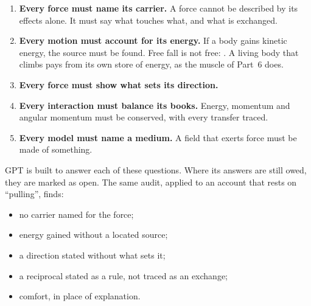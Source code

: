 \documentclass[11pt,a4paper]{article}
\begin{document}
\begin{enumerate}
    \item \textbf{Every force must name its carrier.} A force cannot be described by its effects alone. It must say what touches what, and what is exchanged. 

    \item \textbf{Every motion must account for its energy.} If a body gains kinetic energy, the source must be found. Free fall is not free: . A living body that climbs pays from its own store of energy, as the muscle of Part~6 does.

    \item \textbf{Every force must show what sets its direction.} 

    \item \textbf{Every interaction must balance its books.} Energy, momentum and angular momentum must be conserved, with every transfer traced. 

    \item \textbf{Every model must name a medium.} A field that exerts force must be made of something. 
\end{enumerate}

GPT is built to answer each of these questions. Where its answers are still owed, they are marked as open. The same audit, applied to an account that rests on ``pulling'', finds:
\begin{itemize}
    \item no carrier named for the force;
    \item energy gained without a located source;
    \item a direction stated without what sets it;
    \item a reciprocal stated as a rule, not traced as an exchange;
    \item comfort, in place of explanation.
\end{itemize}
\end{document}
